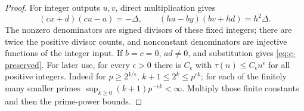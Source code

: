 \documentclass[11pt]{article}
\theoremstyle{definition}
\theoremstyle{remark}
\numberwithin{equation}{section}
\begin{document}
\begin{proof}
For integer outputs $u,v$, direct multiplication gives
\begin{equation}\label{eq:c-divisor-identities}
 (cx+d)(cu-a)=-\Delta,\qquad(ha-by)(bv+hd)=h^2\Delta.
\end{equation}
The nonzero denominators are signed divisors of these fixed integers; there are twice the positive
 divisor counts, and nonconstant denominators are injective functions of the integer input.
If $b=c=0$, $ad\ne0$, and substitution gives \eqref{eq:c-preserved}.
For later use, for every $\epsilon>0$ there is $C_\epsilon$ with
$\tau(n)\le C_\epsilon n^\epsilon$ for all positive integers. Indeed for
$p\ge2^{1/\epsilon}$, $k+1\le2^k\le p^{\epsilon k}$; for each of the finitely many smaller primes
$\sup_{k\ge0}(k+1)p^{-\epsilon k}<\infty$. Multiply those finite constants and then the prime-power
bounds.
\end{proof}
\end{document}
